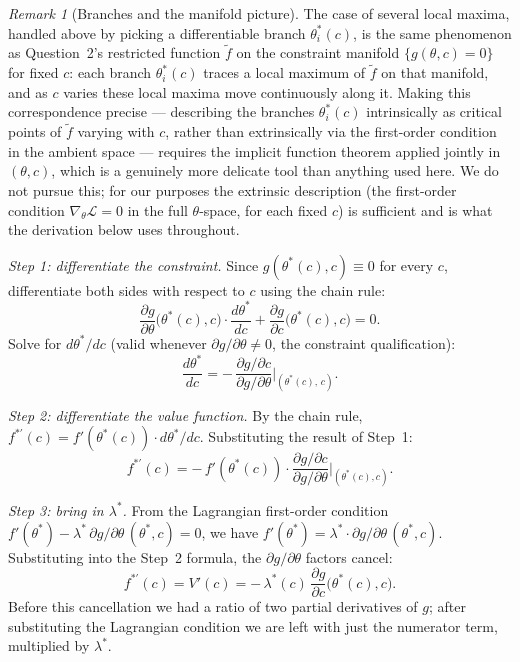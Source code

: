\documentclass[a4paper,oneside,12pt]{extarticle}
\theoremstyle{plain}
\theoremstyle{definition}
\theoremstyle{remark}
\newtheorem{remark}[proposition]{Remark}
\begin{document}
\begin{remark}[Branches and the manifold picture]
The case of several local maxima, handled above by picking a
differentiable branch $\theta^*_i(c)$, is the same phenomenon as
Question~2's restricted function $\tilde f$ on the constraint
manifold $\{g(\theta,c)=0\}$ for fixed $c$: each branch
$\theta^*_i(c)$ traces a local maximum of $\tilde f$ on that
manifold, and as $c$ varies these local maxima move continuously
along it.  Making this correspondence precise --- describing the
branches $\theta^*_i(c)$ intrinsically as critical points of
$\tilde f$ varying with $c$, rather than extrinsically via the
first-order condition in the ambient space --- requires the
implicit function theorem applied jointly in $(\theta,c)$, which is
a genuinely more delicate tool than anything used here. We do not
pursue this; for our purposes the extrinsic description (the
first-order condition $\nabla_\theta\mathcal{L}=0$ in the full
$\theta$-space, for each fixed $c$) is sufficient and is what the
derivation below uses throughout.
\end{remark}

\emph{Step 1: differentiate the constraint.}
Since $g(\theta^*(c), c) \equiv 0$ for every $c$, differentiate
both sides with respect to $c$ using the chain rule:
\[
  \frac{\partial g}{\partial\theta}\Big(\theta^*(c),c\Big)\cdot
  \frac{d\theta^*}{dc}
  +
  \frac{\partial g}{\partial c}\Big(\theta^*(c),c\Big) = 0.
\]
Solve for $d\theta^*/dc$ (valid whenever $\partial g/\partial\theta
\ne 0$, the constraint qualification):
\[
  \frac{d\theta^*}{dc} =
  -\,\frac{\partial g/\partial c}{\partial g/\partial\theta}
  \bigg|_{(\theta^*(c),\,c)}.
\]

\emph{Step 2: differentiate the value function.}
By the chain rule, $f^{*\prime}(c) = f'(\theta^*(c))\cdot
d\theta^*/dc$.  Substituting the result of Step~1:
\[
  f^{*\prime}(c) =
  -\,f'(\theta^*(c))\cdot
  \frac{\partial g/\partial c}{\partial g/\partial\theta}
  \bigg|_{(\theta^*(c),c)}.
\]

\emph{Step 3: bring in $\lambda^*$.}
From the Lagrangian first-order condition
$f'(\theta^*) - \lambda^*\,\partial g/\partial\theta\,(\theta^*,c) = 0$,
we have $f'(\theta^*) = \lambda^*\cdot \partial g/\partial\theta\,(\theta^*,c)$.
Substituting into the Step~2 formula, the
$\partial g/\partial\theta$ factors cancel:
\[
  \boxed{\,f^{*\prime}(c) = V'(c) =
  -\,\lambda^*(c)\,\frac{\partial g}{\partial c}\Big(\theta^*(c),c\Big).\,}
\]
Before this cancellation we had a ratio of two partial derivatives
of $g$; after substituting the Lagrangian condition we are left
with just the numerator term, multiplied by $\lambda^*$.
\end{document}
